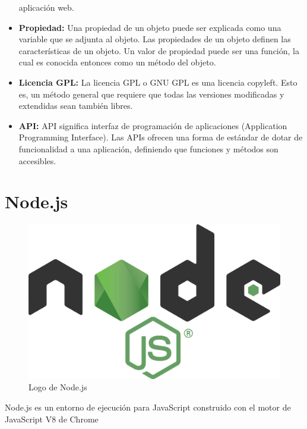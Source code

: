 \documentclass[openright,twoside,10pt]{book}
\begin{document}
\begin{itemize}
      aplicación web.
    \item
      \textbf{Propiedad:} \cite{mozilla_properties} Una propiedad de un
      objeto puede ser explicada como una variable que se adjunta al objeto.
      Las propiedades de un objeto definen las características de un objeto.
      Un valor de propiedad puede ser una función, la cual es conocida
      entonces como un método del objeto.
    \item
      \textbf{Licencia GPL:} \cite{GNU_GPL, GNU_copyleft} La licencia GPL o
      GNU GPL es una licencia copyleft. Esto es, un método general que
      requiere que todas las versiones modificadas y extendidas sean también
      libres.
    \item
      \textbf{API:} API significa interfaz de programación de aplicaciones
      (Application Programming Interface). Las APIs ofrecen una forma de
      estándar de dotar de funcionalidad a una aplicación, definiendo que
      funciones y métodos son accesibles.
    \end{itemize}
    
    \section{Node.js}\label{node.js}
    
    \begin{figure}[H]
        \begin{center}
            \includegraphics[scale=0.05]{img/nodejs.png}
        \end{center}
        \caption{Logo de Node.js}
    \end{figure}
    
    Node.js es un entorno de ejecución para JavaScript construido con el
    motor de JavaScript V8 de Chrome
    
\end{document}
